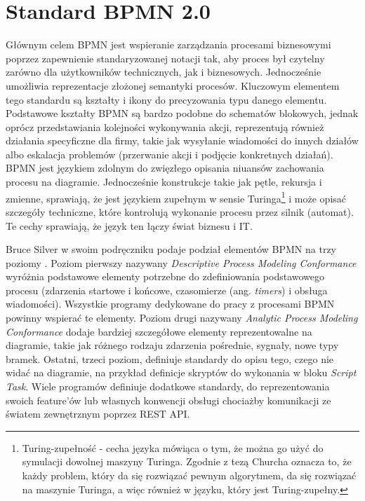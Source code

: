 \documentclass[declaration,shortabstract,mgr]{iithesis}
\newcommand{\bpmn}{BPMN }
\newcommand{\Bpmn}{\textsc{BPMN }}
\begin{document}
\chapter{Standard BPMN 2.0}\label{chapter-bpmn}
Głównym celem \bpmn jest wspieranie zarządzania procesami biznesowymi poprzez zapewnienie standaryzowanej notacji tak, aby proces był czytelny zarówno dla użytkowników technicznych, jak i biznesowych. Jednocześnie umożliwia reprezentacje złożonej semantyki procesów. Kluczowym elementem tego standardu są kształty i ikony do precyzowania typu danego elementu. Podstawowe kształty \bpmn są bardzo podobne do schematów blokowych, jednak oprócz przedstawiania kolejności wykonywania akcji, reprezentują również działania specyficzne dla firmy, takie jak wysyłanie wiadomości do innych działów albo eskalacja problemów (przerwanie akcji i podjęcie konkretnych działań). \Bpmn jest językiem zdolnym do zwięzłego opisania niuansów zachowania procesu na diagramie. Jednocześnie konstrukcje takie jak pętle, rekursja i zmienne, sprawiają, że jest językiem zupełnym w sensie Turinga\footnote{Turing-zupełność - cecha języka mówiąca o tym, że można go użyć do symulacji dowolnej maszyny Turinga. Zgodnie z tezą Churcha oznacza to, że każdy problem, który da się rozwiązać pewnym algorytmem, da się rozwiązać na maszynie Turinga, a więc również w języku, który jest Turing-zupełny.} i może opisać szczegóły techniczne, które kontrolują wykonanie procesu przez silnik (automat). Te cechy sprawiają, że język ten łączy świat biznesu i IT. 

Bruce Silver w swoim podręczniku podaje podział elementów \bpmn na trzy poziomy \cite{bruce-silver-bpmn-levels}. Poziom pierwszy nazywany \textit{Descriptive Process Modeling Conformance} wyróżnia podstawowe elementy potrzebne do zdefiniowania podstawowego procesu (zdarzenia startowe i końcowe, czasomierze (ang. \textit{timers}) i obsługa wiadomości). Wszystkie programy dedykowane do pracy z procesami \bpmn powinny wspierać te elementy. Poziom drugi nazywany \textit{Analytic Process Modeling Conformance} dodaje bardziej szczegółowe elementy reprezentowalne na diagramie, takie jak różnego rodzaju zdarzenia pośrednie, sygnały, nowe typy bramek. Ostatni, trzeci poziom, definiuje standardy do opisu tego, czego nie widać na diagramie, na przykład definicje skryptów do wykonania w bloku \textit{Script Task}. Wiele programów definiuje dodatkowe standardy, do reprezentowania swoich feature'ów lub własnych konwencji obsługi chociażby komunikacji ze światem zewnętrznym poprzez REST API.
\end{document}
